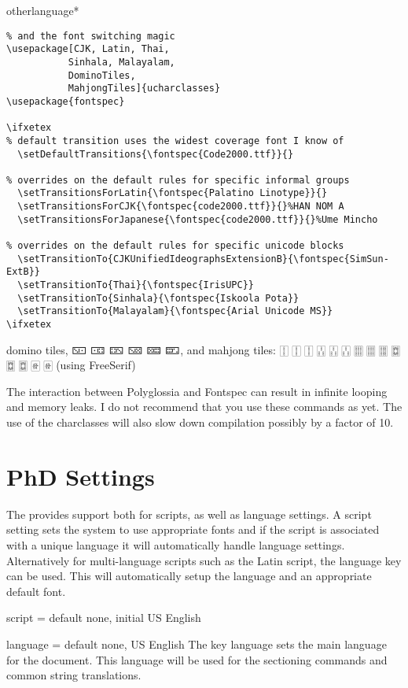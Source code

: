 \begin{docCommandd}{otherlanguage*} { }
\begin{verbatim}
% and the font switching magic
\usepackage[CJK, Latin, Thai, 
           Sinhala, Malayalam, 
           DominoTiles, 
           MahjongTiles]{ucharclasses}
\usepackage{fontspec}

\ifxetex
% default transition uses the widest coverage font I know of
  \setDefaultTransitions{\fontspec{Code2000.ttf}}{}

% overrides on the default rules for specific informal groups
  \setTransitionsForLatin{\fontspec{Palatino Linotype}}{}
  \setTransitionsForCJK{\fontspec{code2000.ttf}}{}%HAN NOM A
  \setTransitionsForJapanese{\fontspec{code2000.ttf}}{}%Ume Mincho

% overrides on the default rules for specific unicode blocks
  \setTransitionTo{CJKUnifiedIdeographsExtensionB}{\fontspec{SimSun-ExtB}}
  \setTransitionTo{Thai}{\fontspec{IrisUPC}}
  \setTransitionTo{Sinhala}{\fontspec{Iskoola Pota}}
  \setTransitionTo{Malayalam}{\fontspec{Arial Unicode MS}}
\ifxetex
\end{verbatim}

{
\newfontfamily{}
\mahjong
domino tiles, 🁇 🀼 🁐 🁋 🁚 🁝, and mahjong tiles: 🀑 🀑 🀑 🀒 🀒 🀒 🀕 🀕 🀕 🀗 🀗 🀗 🀅 🀅 (using FreeSerif)

}

The interaction between Polyglossia and Fontspec can result in infinite looping and memory leaks. I do not recommend that you use these commands as yet. The use of the charclasses will also slow down compilation possibly by a factor of 10.



\section{PhD Settings}

The  provides support both for scripts, as well as language settings. A script setting sets the system to use appropriate fonts and if the script is associated with a unique language it will automatically handle language settings. Alternatively for multi-language scripts such as the Latin script, the language key can be used. This will automatically setup the language and an appropriate default font. 

\begin{docKey}[phd]{script} { = } {default none, initial US English}{}
\end{docKey}

\begin{docKey}{language}{ =}  {default none, US English}
The key language sets the main language for the document. This language will be used for the sectioning commands and common string translations.


\end{docKey}
\end{docCommandd}
